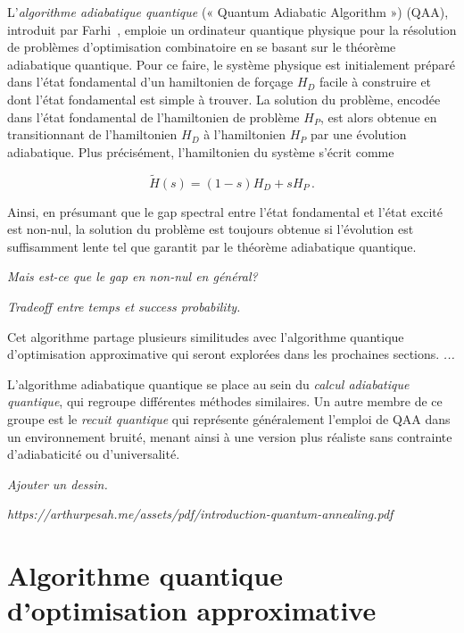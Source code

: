 L'\textit{algorithme adiabatique quantique} (« Quantum Adiabatic Algorithm ») (QAA), introduit par Farhi~\cite{farhiQuantumComputationAdiabatic2000}, emploie un ordinateur quantique physique pour la résolution de problèmes d'optimisation combinatoire en se basant sur le théorème adiabatique quantique. Pour ce faire, le système physique est initialement préparé dans l'état fondamental d'un hamiltonien de forçage $H_{D}$ facile à construire et dont l'état fondamental est simple à trouver. La solution du problème, encodée dans l'état fondamental de l'hamiltonien de problème $H_{P}$, est alors obtenue en transitionnant de l'hamiltonien $H_{D}$ à l'hamiltonien $H_{P}$ par une évolution adiabatique. Plus précisément, l'hamiltonien du système s'écrit comme


\begin{equation}
    \tilde{H}(s) = \left(1-s\right) H_{D} + s H_{P} \,.
\end{equation}

Ainsi, en présumant que le gap spectral entre l'état fondamental et l'état excité est non-nul, la solution du problème est toujours obtenue si l'évolution est suffisamment lente tel que garantit par le théorème adiabatique quantique.

\textcolor{mydarkred}{\textit{Mais est-ce que le gap en non-nul en général?}}

\textcolor{mydarkred}{\textit{Tradeoff entre temps et success probability.}}

Cet algorithme partage plusieurs similitudes avec l'algorithme quantique d'optimisation approximative qui seront explorées dans les prochaines sections. \textcolor{mydarkred}{\textit{...}}


L'algorithme adiabatique quantique se place au sein du \textit{calcul adiabatique quantique}, qui regroupe différentes méthodes similaires. Un autre membre de ce groupe est le \textit{recuit quantique} qui représente généralement l'emploi de QAA dans un environnement bruité, menant ainsi à une version plus réaliste sans contrainte d'adiabaticité ou d'universalité. 

\textcolor{mydarkred}{\textit{Ajouter un dessin.}}

\textcolor{mydarkred}{\textit{https://arthurpesah.me/assets/pdf/introduction-quantum-annealing.pdf}}


\section{Algorithme quantique d'optimisation approximative}

